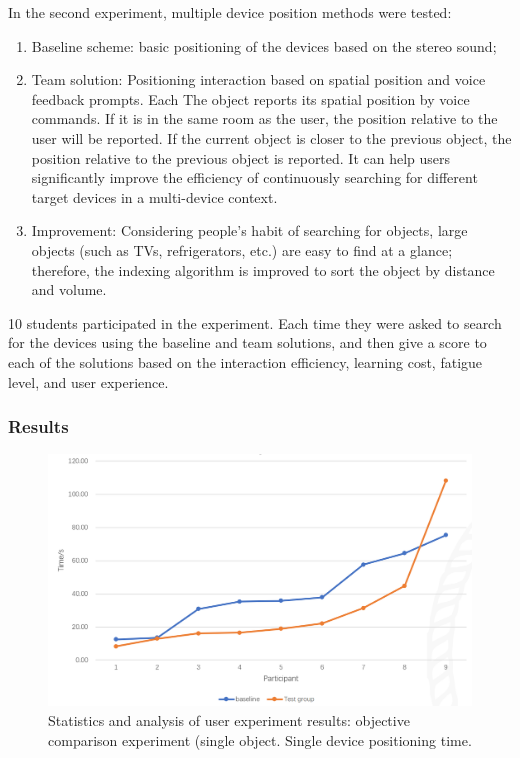In the second experiment, multiple device position methods were tested:
\begin{enumerate}
    \item Baseline scheme: basic positioning of the devices based on the stereo sound;
    \item Team solution: Positioning interaction based on spatial position and voice feedback prompts. Each The object reports its spatial position by voice commands. If it is in the same room as the user, the position relative to the user will be reported. If the current object is closer to the previous object, the position relative to the previous object is reported. It can help users significantly improve the efficiency of continuously searching for different target devices in a multi-device context.
    \item Improvement: Considering people’s habit of searching for objects, large objects (such as TVs, refrigerators, etc.) are easy to find at a glance; therefore, the indexing algorithm is improved to sort the object by distance and volume.
\end{enumerate}

10 students participated in the experiment. Each time they were asked to search for the devices using the baseline and team solutions, and then give a score to each of the solutions based on the interaction efficiency, learning cost, fatigue level, and user experience. 

\subsubsection{Results}

\begin{figure}
  \centering
  \includegraphics[width=0.9\linewidth]{figures/Project_1.png}
  \caption{Statistics and analysis of user experiment results: objective comparison experiment (single object. Single device positioning time.}
  \label{fig:Project1-figure}
\end{figure}

